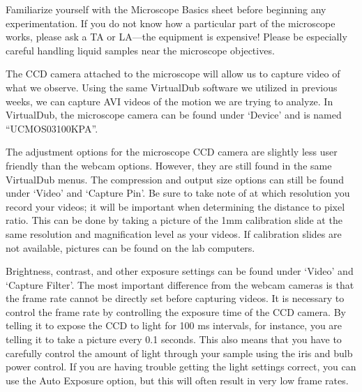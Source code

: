 Familiarize yourself with the Microscope Basics sheet before beginning any experimentation. 
If you do not know how a particular part of the microscope works, please ask a TA or LA—the equipment is expensive! 
Please be especially careful handling liquid samples near the microscope objectives. 
\par 
The CCD camera attached to the microscope will allow us to capture video of what we observe. 
Using the same VirtualDub software we utilized in previous weeks, we can capture AVI videos of the motion we are trying to analyze. 
In VirtualDub, the microscope camera can be found under `Device' and is named ``UCMOS03100KPA''. 
\par 
The adjustment options for the microscope CCD camera are slightly less user friendly than the webcam options. 
However, they are still found in the same VirtualDub menus. 
The compression and output size options can still be found under `Video' and `Capture Pin'. 
Be sure to take note of at which resolution you record your videos; it will be important when determining the distance to pixel ratio. 
This can be done by taking a picture of the 1mm calibration slide at the same resolution and magnification level as your videos. 
If calibration slides are not available, pictures can be found on the lab computers. 
\par 
Brightness, contrast, and other exposure settings can be found under `Video' and `Capture Filter'. 
The most important difference from the webcam cameras is that the frame rate cannot be directly set before capturing videos. 
It is necessary to control the frame rate by controlling the exposure time of the CCD camera. 
By telling it to expose the CCD to light for 100 ms intervals, for instance, you are telling it to take a picture every 0.1 seconds. 
This also means that you have to carefully control the amount of light through your sample using the iris and bulb power control. 
If you are having trouble getting the light settings correct, you can use the Auto Exposure option, but this will often result in very low frame rates.
%
